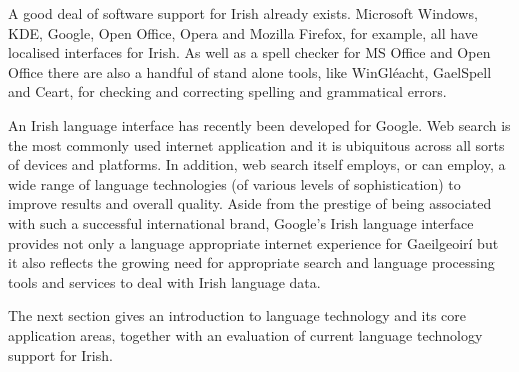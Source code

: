 \begin{multicols}{2}
A good deal of software support for Irish already exists. Microsoft Windows, KDE, Google, Open Office, Opera and Mozilla Firefox, for example, all have localised interfaces for Irish. As well as a spell checker for MS Office and Open Office there are also a handful of stand alone tools, like WinGléacht, GaelSpell and Ceart, for checking and correcting spelling and grammatical errors. 



An Irish language interface has recently been developed for Google. Web search is the most commonly used internet application and it is ubiquitous across all sorts of devices and platforms. In addition, web search itself employs, or can employ, a wide range of language technologies (of various levels of sophistication) to improve results and overall quality. Aside from the prestige of being associated with such a successful international brand, Google’s Irish language interface provides not only a language appropriate internet experience for Gaeilgeoirí but it also reflects the growing need for appropriate search and language processing tools and services to deal with Irish language data.

The next section gives an introduction to language technology and its core application areas, together with an evaluation of current language technology support for Irish.



\end{multicols}

